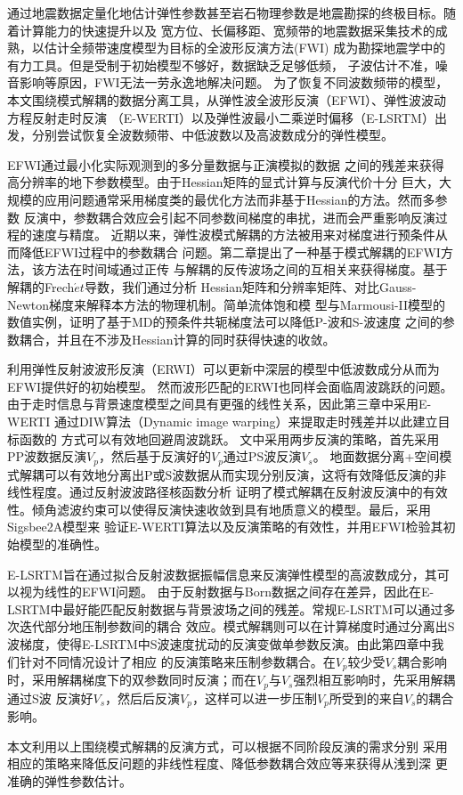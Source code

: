 \begin{cabstract}
	通过地震数据定量化地估计弹性参数甚至岩石物理参数是地震勘探的终极目标。随着计算能力的快速提升以及
	宽方位、长偏移距、宽频带的地震数据采集技术的成熟，以估计全频带速度模型为目标的全波形反演方法(FWI)
	成为勘探地震学中的有力工具。但是受制于初始模型不够好，数据缺乏足够低频，
	子波估计不准，噪音影响等原因，FWI无法一劳永逸地解决问题。
	为了恢复不同波数频带的模型，本文围绕模式解耦的数据分离工具，从弹性波全波形反演（EFWI）、弹性波波动方程反射走时反演
	（E-WERTI）以及弹性波最小二乘逆时偏移（E-LSRTM）出发，分别尝试恢复全波数频带、中低波数以及高波数成分的弹性模型。

	EFWI通过最小化实际观测到的多分量数据与正演模拟的数据
	之间的残差来获得高分辨率的地下参数模型。由于Hessian矩阵的显式计算与反演代价十分
	巨大，大规模的应用问题通常采用梯度类的最优化方法而非基于Hessian的方法。然而多参数
	反演中，参数耦合效应会引起不同参数间梯度的串扰，进而会严重影响反演过程的速度与精度。
	近期以来，弹性波模式解耦的方法被用来对梯度进行预条件从而降低EFWI过程中的参数耦合
	问题。第二章提出了一种基于模式解耦的EFWI方法，该方法在时间域通过正传
	与解耦的反传波场之间的互相关来获得梯度。基于解耦的Frech$\acute{e}t$导数，我们通过分析
	Hessian矩阵和分辨率矩阵、对比Gauss-Newton梯度来解释本方法的物理机制。简单流体饱和模
	型与Marmousi-II模型的数值实例，证明了基于MD的预条件共轭梯度法可以降低P-波和S-波速度
	之间的参数耦合，并且在不涉及Hessian计算的同时获得快速的收敛。

	利用弹性反射波波形反演（ERWI）可以更新中深层的模型中低波数成分从而为EFWI提供好的初始模型。
	然而波形匹配的ERWI也同样会面临周波跳跃的问题。由于走时信息与背景速度模型之间具有更强的线性关系，因此第三章中采用E-WERTI
	通过DIW算法（Dynamic image warping）来提取走时残差并以此建立目标函数的
	方式可以有效地回避周波跳跃。
	文中采用两步反演的策略，首先采用PP波数据反演$V_p$，然后基于反演好的$V_p$通过PS波反演$V_s$。
	地面数据分离+空间模式解耦可以有效地分离出P或S波数据从而实现分别反演，这将有效降低反演的非线性程度。通过反射波波路径核函数分析
	证明了模式解耦在反射波反演中的有效性。倾角滤波约束可以使得反演快速收敛到具有地质意义的模型。最后，采用Sigsbee2A模型来
	验证E-WERTI算法以及反演策略的有效性，并用EFWI检验其初始模型的准确性。

	E-LSRTM旨在通过拟合反射波数据振幅信息来反演弹性模型的高波数成分，其可以视为线性的EFWI问题。
	由于反射数据与Born数据之间存在差异，因此在E-LSRTM中最好能匹配反射数据与背景波场之间的残差。常规E-LSRTM可以通过多次迭代部分地压制参数间的耦合
	效应。模式解耦则可以在计算梯度时通过分离出S波梯度，使得E-LSRTM中S波速度扰动的反演变做单参数反演。由此第四章中我们针对不同情况设计了相应
	的反演策略来压制参数耦合。在$V_p$较少受$V_s$耦合影响时，采用解耦梯度下的双参数同时反演；而在$V_p$与$V_s$强烈相互影响时，先采用解耦通过S波
	反演好$V_s$，然后后反演$V_p$，这样可以进一步压制$V_p$所受到的来自$V_s$的耦合影响。

	本文利用以上围绕模式解耦的反演方式，可以根据不同阶段反演的需求分别
	采用相应的策略来降低反问题的非线性程度、降低参数耦合效应等来获得从浅到深
	更准确的弹性参数估计。


\end{cabstract}


